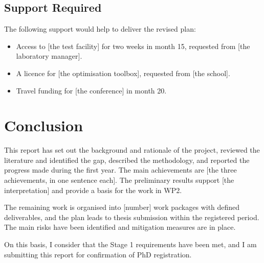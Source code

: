 \documentclass{article}
\begin{document}
\subsection{Support Required}
The following support would help to deliver the revised plan:
\begin{itemize}[leftmargin=*]
    \item Access to [the test facility] for two weeks in month 15, requested from [the
    laboratory manager].
    \item A licence for [the optimisation toolbox], requested from [the school].
    \item Travel funding for [the conference] in month 20.
\end{itemize}

\section{Conclusion}

This report has set out the background and rationale of the project, reviewed the literature
and identified the gap, described the methodology, and reported the progress made during the
first year. The main achievements are [the three achievements, in one sentence each]. The
preliminary results support [the interpretation] and provide a basis for the work in WP2.

The remaining work is organised into [number] work packages with defined deliverables, and the
plan leads to thesis submission within the registered period. The main risks have been
identified and mitigation measures are in place.

On this basis, I consider that the Stage 1 requirements have been met, and I am submitting this
report for confirmation of PhD registration.

\addrefstosection
\printreferences
\end{document}
